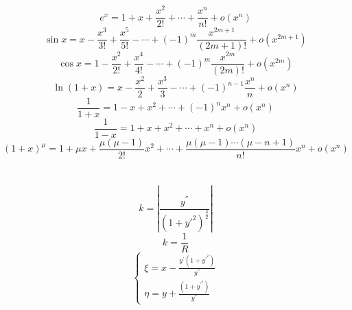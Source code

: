 \documentclass[]{article}
\numberwithin{equation}{section}
\begin{document}
\section{}
\begin{equation}
    e^x=1+x+\frac{x^2}{2!}+\cdots+\frac{x^n}{n!}+o(x^n)
\end{equation}
\begin{equation}
    \sin x=x-\frac{x^3}{3!}+\frac{x^5}{5!}-\cdots+(-1)^m\frac{x^{2m+1}}{(2m+1)!}+o(x^{2m+1})
\end{equation}
\begin{equation}
    \cos x=1-\frac{x^2}{2!}+\frac{x^4}{4!}-\cdots+(-1)^m\frac{x^{2m}}{(2m)!}+o(x^{2m})
\end{equation}
\begin{equation}
    \ln(1+x)=x-\frac{x^2}{2}+\frac{x^3}{3}-\cdots+(-1)^{n-1}\frac{x^n}{n}+o(x^n)
\end{equation}
\begin{equation}
    \frac{1}{1+x}=1-x+x^2+\cdots+(-1)^nx^n+o(x^n)
\end{equation}
\begin{equation}
    \frac{1}{1-x}=1+x+x^2+\cdots+x^n+o(x^n)
\end{equation}
\begin{equation}
    (1+x)^\mu=1+\mu x+\frac{\mu(\mu-1)}{2!}x^2+\cdots+\frac{\mu(\mu-1)\cdots(\mu-n+1)}{n!}x^n+o(x^n)
\end{equation}

\section{}
\begin{equation}
    k=\left|\frac{y^{''}}{(1+y{'^2})^\frac{3}{2}}\right|
\end{equation}
\begin{equation}
    k=\frac{1}{R}
\end{equation}
\begin{equation}
    \begin{cases}
        \xi=x-\frac{y^{'}(1+y^{'^2})}{y^{''}} \\
        \eta=y+\frac{(1+y^{'^2})}{y^{''}}
    \end{cases}
\end{equation}
\end{document}
